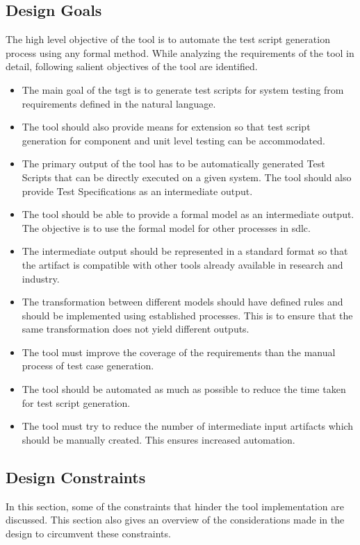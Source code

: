 \subsection{Design Goals}
The high level objective of the tool is to automate the test script generation process using any formal method. While analyzing the requirements of the tool in detail, following salient objectives of the tool are identified.
\begin{itemize}
\item The main goal of the \gls{tsgt} is to generate test scripts for system testing from requirements defined in the natural language.
\item The tool should also provide means for extension so that test script generation for component and unit level testing can be accommodated.
\item The primary output of the tool has to be automatically generated Test Scripts that can be directly executed on a given system. The tool should also provide Test Specifications as an intermediate output.
\item The tool should be able to provide a formal model as an intermediate output. The objective is to use the formal model for other processes in \gls{sdlc}.
\item The intermediate output should be represented in a standard format so that the artifact is compatible with other tools already available in research and industry.
\item The transformation between different models should have defined rules and should be implemented using established processes. This is to ensure that the same transformation does not yield different outputs.
\item The tool must improve the coverage of the requirements than the manual process of test case generation.
\item The tool should be automated as much as possible to reduce the time taken for test script generation.
\item The tool must try to reduce the number of intermediate input artifacts which should be manually created. This ensures increased automation.
\end{itemize}


\subsection{Design Constraints}
In this section, some of the constraints that hinder the tool implementation are discussed. This section also gives an overview of the considerations made in the design to circumvent these constraints.

